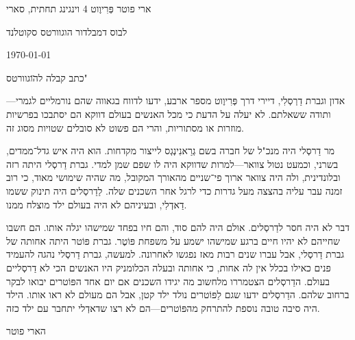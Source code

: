 \useOpTeX

\def\נושא{\subject}
\helang \quotes %
\fontfam[culmus]


\hfill\address
 הארי פוטר
 פְּרִיוֶוט 4 
וינגינג תחתית, סארי

\bigskip

\address
  אלבוס דמבלדור
  הוגוורטס
  סקוטלנד

\hfill\today

\נושא מכתב קבלה ל\"הוגוורטס"

 אדון וגברת דַרְסְלִי, דיירי דרך פְּרִיוֶוט מספר ארבע, ידעו לדווח בגאווה שהם נורמליים לגמרי---ותודה ששאלתם. לא יעלה על הדעת כי מכל האנשים בעולם דווקא הם יסתבכו בפרשיות מוזרות או מסתוריות, והרי הם פשוט לא סובלים שטויות מסוג זה.

מר דַרסְלי היה מנכ"ל של חברה בשם גְרַאנִינְגְס לייצור מקדחות. הוא היה איש גדל־ממדים, בשרני, וכמעט נטול צוואר---למרות שדווקא היה לו שפם שמן למדי. גברת דַרסְלי היתה רזה ובלונדינית, ולה היה צוואר ארוך פי־שניים מהאורך המקובל, מה שהיה שימושי מאוד, כי רוב זמנה עבר עליה בהצצה מעל גדרות כדי לרגל אחר השכנים שלה. לַדַרסְלים היה תינוק ששמו דַאדְלִי, ובעיניהם לא היה בעולם ילד מוצלח ממנו.

דבר לא היה חסר לדַרסְלים. אולם היה להם סוד, והם חיו בפחד שמישהו יגלה אותו. הם חשבו שחייהם לא יהיו חיים ברגע שמישהו ישמע על משפחת פּוֹטֶר. גברת פּוֹטר היתה אחותה של גברת דַרסְלי, אבל עברו שנים רבות מאז נפגשו לאחרונה. למעשה, גברת דַרסְלי נהגה להעמיד פנים כאילו בכלל אין לה אחות, כי אחותה ובעלה הכלומניק היו האנשים הכי לא דַרסְליים בעולם. הדַרסְלים הצטמררו מלחשוב מה יגידו השכנים אם יום אחד הפּוֹטרים יבואו לבקר ברחוב שלהם. הדַרסְלים ידעו שגם לַפּוֹטרים נולד ילד קטן, אבל הם מעולם לא ראו אותו. הילד היה סיבה טובה נוספת להתרחק מהפּוֹטרים---הם לא רצו שדאדְלי יתחבר עם ילד כזה.
\bigskip %
\bigskip

הארי פוטר
\bye
